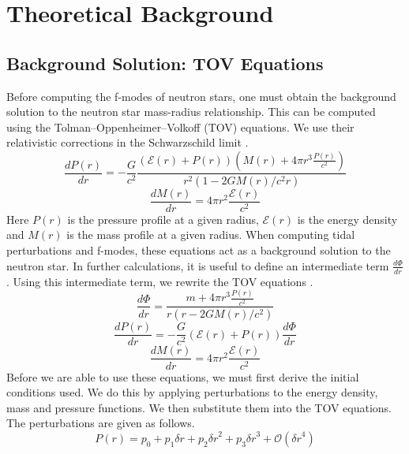\documentclass[aps,prd,twocolumn,superscriptaddress,footinbib]{revtex4-1}
\begin{document}
\section{Theoretical Background}
\subsection{Background Solution: TOV Equations}
Before computing the f-modes of neutron stars, one must obtain the background solution to the neutron star mass-radius relationship. This can be computed using the Tolman–Oppenheimer–Volkoff (TOV) equations. We use their relativistic corrections in the Schwarzschild limit \cite{piekarewicz2017neutron, Silbar_2004}. 
\begin{equation}
\frac{d P(r)}{d r}=-\frac{G}{c^{2}} \frac{(\mathcal{E}(r)+P(r))\left(M(r)+4 \pi r^{3} \frac{P(r)}{c^{2}}\right)}{r^{2}\left(1-2 G M(r) / c^{2} r\right)}
\end{equation}
\begin{equation}
\frac{d M(r)}{d r}=4 \pi r^{2} \frac{\mathcal{E}(r)}{c^{2}}
\end{equation}
Here $P(r)$ is the pressure profile at a given radius, $\mathcal{E}(r)$ is the energy density and $M(r)$ is the mass profile at a given radius. When computing tidal perturbations and f-modes, these equations act as a background solution to the neutron star. 
In further calculations, it is useful to define an intermediate term $\frac{d \Phi}{d r}$. Using this intermediate term, we rewrite the TOV equations \cite{Sotani_2011}. 
\begin{equation}
\frac{d \Phi}{d r}=\frac{m+4 \pi r^{3} \frac{P(r)}{c^{2}}}{r\left(r-2 G M(r) / c^{2}\right)}
\end{equation}
\begin{equation}
\frac{d P(r)}{d r}=-\frac{G}{c^{2}} (\mathcal{E}(r)+P(r))\frac{d \Phi}{d r}
\end{equation}
\begin{equation}
\frac{d M(r)}{d r}=4 \pi r^{2} \frac{\mathcal{E}(r)}{c^{2}}
\end{equation}
Before we are able to use these equations, we must first derive the initial conditions used. We do this by applying perturbations to the energy density, mass and pressure functions. We then substitute them into the TOV equations. The perturbations are given as follows. 
\begin{equation}
    P(r) = p_0 + p_1{\delta r} + p_2{\delta r}^2 + p_3{\delta r}^3 + \mathcal{O}({\delta r}^4)
\end{equation}
\end{document}
